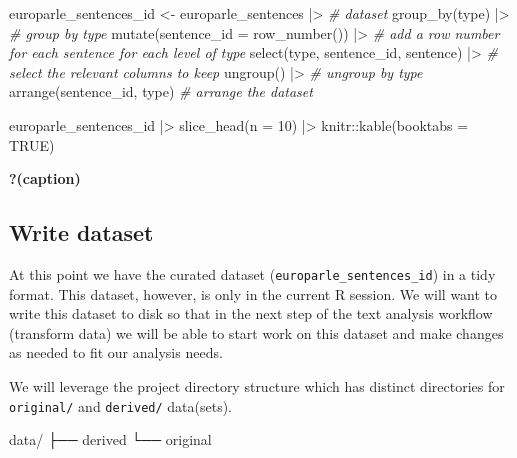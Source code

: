 \documentclass[
  letterpaper,
  DIV=11,
  numbers=noendperiod]{scrreport}
\newenvironment{Shaded}{\begin{snugshade}}{\end{snugshade}}
\newcommand{\AttributeTok}[1]{\textcolor[rgb]{0.00,0.00,0.00}{#1}}
\newcommand{\CommentTok}[1]{\textcolor[rgb]{0.00,0.00,0.00}{\textit{#1}}}
\newcommand{\ConstantTok}[1]{\textcolor[rgb]{0.00,0.00,0.00}{#1}}
\newcommand{\DecValTok}[1]{\textcolor[rgb]{0.00,0.00,0.00}{#1}}
\newcommand{\ExtensionTok}[1]{\textcolor[rgb]{0.00,0.00,0.00}{#1}}
\newcommand{\FunctionTok}[1]{\textcolor[rgb]{0.00,0.00,0.00}{#1}}
\newcommand{\NormalTok}[1]{\textcolor[rgb]{0.00,0.00,0.00}{#1}}
\newcommand{\OtherTok}[1]{\textcolor[rgb]{0.00,0.00,0.00}{#1}}
\newcommand{\SpecialCharTok}[1]{\textcolor[rgb]{0.00,0.00,0.00}{#1}}
\theoremstyle{definition}
\theoremstyle{remark}
\begin{document}
\begin{Shaded}
\begin{Highlighting}[]
\NormalTok{europarle\_sentences\_id }\OtherTok{\textless{}{-}}
\NormalTok{  europarle\_sentences }\SpecialCharTok{|\textgreater{}} \CommentTok{\# dataset}
  \FunctionTok{group\_by}\NormalTok{(type) }\SpecialCharTok{|\textgreater{}} \CommentTok{\# group by type}
  \FunctionTok{mutate}\NormalTok{(}\AttributeTok{sentence\_id =} \FunctionTok{row\_number}\NormalTok{()) }\SpecialCharTok{|\textgreater{}} \CommentTok{\# add a row number for each sentence for each level of type}
  \FunctionTok{select}\NormalTok{(type, sentence\_id, sentence) }\SpecialCharTok{|\textgreater{}} \CommentTok{\# select the relevant columns to keep}
  \FunctionTok{ungroup}\NormalTok{() }\SpecialCharTok{|\textgreater{}} \CommentTok{\# ungroup by type}
  \FunctionTok{arrange}\NormalTok{(sentence\_id, type) }\CommentTok{\# arrange the dataset}

\NormalTok{europarle\_sentences\_id }\SpecialCharTok{|\textgreater{}}
  \FunctionTok{slice\_head}\NormalTok{(}\AttributeTok{n =} \DecValTok{10}\NormalTok{) }\SpecialCharTok{|\textgreater{}}
\NormalTok{  knitr}\SpecialCharTok{::}\FunctionTok{kable}\NormalTok{(}\AttributeTok{booktabs =} \ConstantTok{TRUE}\NormalTok{)}
\end{Highlighting}
\end{Shaded}

\begin{table}

\caption{\textbf{?(caption)}}

\end{table}

\hypertarget{write-dataset}{%
\subsection{Write dataset}\label{write-dataset}}

At this point we have the curated dataset
(\texttt{europarle\_sentences\_id}) in a tidy format. This dataset,
however, is only in the current R session. We will want to write this
dataset to disk so that in the next step of the text analysis workflow
(transform data) we will be able to start work on this dataset and make
changes as needed to fit our analysis needs.

We will leverage the project directory structure which has distinct
directories for \texttt{original/} and \texttt{derived/} data(sets).

\begin{Shaded}
\begin{Highlighting}[]
\ExtensionTok{data/}
\ExtensionTok{├──}\NormalTok{ derived}
\ExtensionTok{└──}\NormalTok{ original}
\end{Highlighting}
\end{Shaded}
\end{document}
